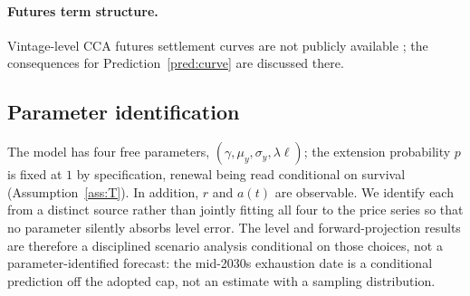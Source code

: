 \documentclass[11pt,letterpaper]{article}
\theoremstyle{plain}
\theoremstyle{definition}
\numberwithin{equation}{section}
\begin{document}
\paragraph{Futures term structure.} Vintage-level CCA futures settlement curves are not publicly available \citep{shi2023}; the consequences for Prediction~\ref{pred:curve} are discussed there.
 
\subsection{Parameter identification}\label{sec:ident}
 
The model has four free parameters, $(\gamma,\mu_y,\sigma_y,\lambda\ell)$; the extension probability $p$ is fixed at $1$ by specification, renewal being read conditional on survival (Assumption~\ref{ass:T}). In addition, $r$ and $a(t)$ are observable. We identify each from a distinct source rather than jointly fitting all four to the price series so that no parameter silently absorbs level error. The level and forward-projection results are therefore a disciplined scenario analysis conditional on those choices, not a parameter-identified forecast: the mid-2030s exhaustion date is a conditional prediction off the adopted cap, not an estimate with a sampling distribution.
 
\end{document}

